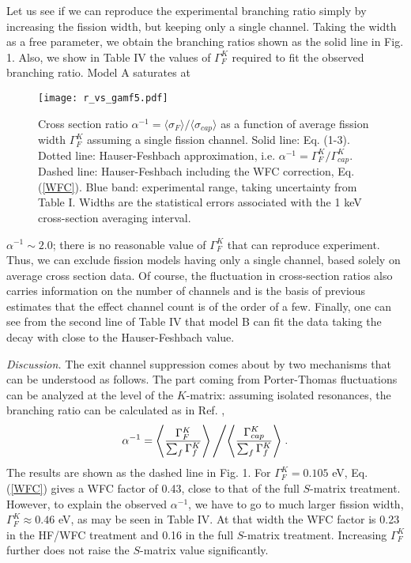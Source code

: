 \documentclass[prl,aps,floatfix,nofootinbib,preprint]{revtex4}
\def\be{\begin{equation}}
\def\ee{\end{equation}}
\begin{document}
Let us see if we can reproduce
the experimental branching ratio simply by increasing the fission width,
but keeping only a single channel.  Taking the width 
as a free parameter, we obtain the branching ratios shown as the
solid line in Fig. 1. Also, we show in Table IV the values of $\Gamma^K_F$ 
required to fit the observed branching ratio.  Model A saturates at
%
\begin{figure}[tb]
\texttt{[image: r\_vs\_gamf5.pdf]}
\caption{Cross section ratio 
$\alpha^{-1}= \langle\sigma_F\rangle/\langle\sigma_{cap}\rangle$ as a function of
average fission width $\Gamma_F^K$ assuming a single 
fission channel.  Solid line:  Eq. (1-3). 
Dotted line:  Hauser-Feshbach approximation, i.e. $\alpha^{-1} = \Gamma_F^K/
\Gamma_{cap}^K$.  Dashed line:  Hauser-Feshbach including the WFC
correction, Eq. (\ref{WFC}). Blue band:  experimental range, taking uncertainty from
Table I.  
Widths are
the statistical errors associated with the 1 keV cross-section averaging 
interval. 
}
\label{ratio}
\end{figure}
%
$\alpha^{-1} \sim 2.0$;  there is no
reasonable value of $\Gamma^K_F$ that can reproduce experiment.  Thus, we can exclude fission 
models having only a single channel, based solely on average cross section data.
Of course, the fluctuation in cross-section ratios also carries information
on the number of channels and is the basis of previous estimates that
the effect channel count is of the order of a few. Finally, one can see from the
second line of Table IV that model B can fit the data taking the decay with
close to the Hauser-Feshbach value.

{\it Discussion.}
The exit channel suppression comes about by two mechanisms that can be
understood as follows.  The part coming from Porter-Thomas fluctuations
	can be analyzed at the level of the $K$-matrix:  assuming isolated
resonances, the branching ratio can be calculated as in Ref. \cite{mo78},
\be
\alpha^{-1} = \left\langle {\Gamma^K_{F}\over \sum_f \Gamma^K_{f}} 
\right\rangle \left/ \left\langle {\Gamma^K_{cap}\over \sum_f \Gamma^K_{f}} 
\right\rangle\right. .
\label{WFC}
\ee
The results are shown as the dashed line in Fig. 1.  For $\Gamma^K_F =
0.105$ eV, Eq. (\ref{WFC}) gives a WFC factor of 0.43, close to that
of the full $S$-matrix treatment. However, to explain the 
observed $\alpha^{-1}$,
we have to go to much larger fission width, $\Gamma^K_F \approx 0.46$ eV,
as may be seen in Table IV. At that width
the WFC factor is 0.23 in the HF/WFC treatment and 0.16 in the
full $S$-matrix treatment.  Increasing $\Gamma^K_F$ further
does not raise the $S$-matrix value significantly.
\end{document}
